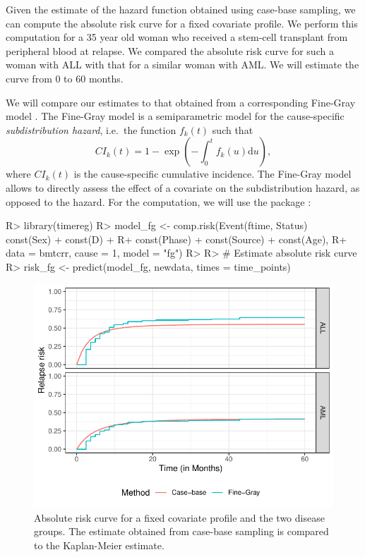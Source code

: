 \documentclass[
]{jss}
\begin{document}
Given the estimate of the hazard function obtained using case-base
sampling, we can compute the absolute risk curve for a fixed covariate
profile. We perform this computation for a 35 year old woman who
received a stem-cell transplant from peripheral blood at relapse. We
compared the absolute risk curve for such a woman with ALL with that for
a similar woman with AML. We will estimate the curve from 0 to 60
months.

We will compare our estimates to that obtained from a corresponding
Fine-Gray model \citeyearpar{fine1999proportional}. The Fine-Gray model
is a semiparametric model for the cause-specific \emph{subdistribution
hazard}, i.e.~the function \(f_k(t)\) such that
\[CI_k(t) =1 - \exp\left( - \int_0^t f_k(u) \textrm{d}u \right),\] where
\(CI_k(t)\) is the cause-specific cumulative incidence. The Fine-Gray
model allows to directly assess the effect of a covariate on the
subdistribution hazard, as opposed to the hazard. For the computation,
we will use the  package \citep{timereg}:

\begin{CodeChunk}

\begin{CodeInput}
R> library(timereg)
R> model_fg <- comp.risk(Event(ftime, Status) ~ const(Sex) + const(D) +
R+                         const(Phase) + const(Source) + const(Age),
R+                       data = bmtcrr, cause = 1, model = "fg")
R> 
R> # Estimate absolute risk curve
R> risk_fg <- predict(model_fg, newdata, times = time_points)
\end{CodeInput}
\end{CodeChunk}

\begin{CodeChunk}
\begin{figure}

{\centering \includegraphics{../figures/bmtcrr-risk-1} 

}

\caption{\label{fig:compAbsrisk} Absolute risk curve for a fixed covariate profile and the two disease groups. The estimate obtained from case-base sampling is compared to the Kaplan-Meier estimate.}\label{fig:bmtcrr-risk}
\end{figure}
\end{CodeChunk}
\end{document}
